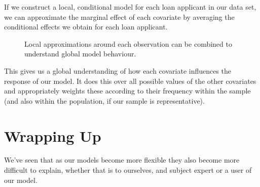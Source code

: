 \documentclass[
  letterpaper,
  DIV=11,
  numbers=noendperiod]{scrreprt}
\begin{document}
If we construct a local, conditional model for each loan applicant in
our data set, we can approximate the marginal effect of each covariate
by averaging the conditional effects we obtain for each loan applicant.

\begin{figure}


\caption{\label{fig-local-approximation}Local approximations around each
observation can be combined to understand global model behaviour.}

\end{figure}%

This gives us a global understanding of how each covariate influences
the response of our model. It does this over all possible values of the
other covariates and appropriately weights these according to their
frequency within the sample (and also within the population, if our
sample is representative).

\section{Wrapping Up}\label{wrapping-up-6}

We've seen that as our models become more flexible they also become more
difficult to explain, whether that is to ourselves, and subject expert
or a user of our model.
\end{document}
